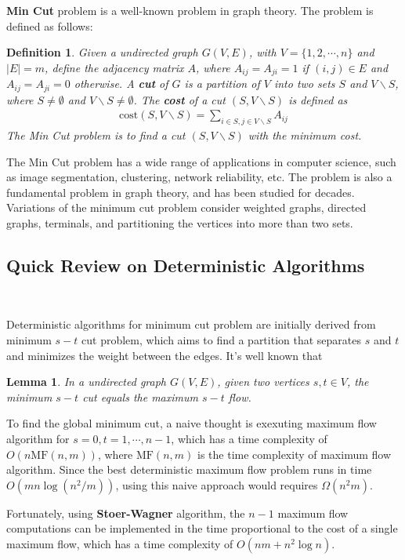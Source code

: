 \documentclass[11pt]{article}
\theoremstyle{plain}
\newtheorem{lemma}{Lemma}[section]
\newtheorem{definition}{Definition}[section]
\begin{document}
\textbf{Min Cut} problem is a well-known problem in graph theory. The problem is defined as follows: 
\begin{definition}
    Given a  undirected graph $G(V,E)$, with $V=\{1,2,\cdots,n\}$ and $|E|=m$, define the adjacency matrix $A$, where $A_{ij}=A_{ji}=1$ if $(i,j)\in E$ and $A_{ij}=A_{ji}=0$ otherwise. A \textbf{cut} of $G$ is a partition of $V$ into two sets $S$ and $V\backslash S$, where $S\neq\emptyset$ and $V\backslash S\neq\emptyset$. The \textbf{cost} of a cut $(S,V\backslash S)$ is defined as
    \begin{align*}
        \text{cost}(S,V\backslash S)=\sum_{i\in S, j\in V\backslash S}A_{ij}
    \end{align*}
    The Min Cut problem is to find a cut $(S,V\backslash S)$ with the minimum cost.
\end{definition}

The Min Cut problem has a wide range of applications in computer science, such as image segmentation, clustering, network reliability, etc. The problem is also a fundamental problem in graph theory, and has been studied for decades. Variations of the minimum cut problem consider weighted graphs, directed graphs, terminals, and partitioning the vertices into more than two sets.

\subsection{Quick Review on Deterministic Algorithms}\

Deterministic algorithms for minimum cut problem are initially derived from minimum $s-t$ cut problem, which aims to find a partition that separates $s$ and $t$ and minimizes the weight between the edges. It's well known that 
\begin{lemma}
    In a undirected graph $G(V,E)$, given two vertices $s,t\in V$, the minimum $s-t$ cut equals the maximum $s-t$ flow.
\end{lemma}
To find the global minimum cut, a naive thought is exexuting maximum flow algorithm for $s=0,t=1,\cdots,n-1$, which has a time complexity of $O(n\text{MF}(n,m))$, where $\text{MF}(n,m)$ is the time complexity of maximum flow algorithm. Since the best deterministic maximum flow problem runs in time $O(mn\log(n^2/m))$, using this naive approach would requires $\Omega(n^2m)$. 

Fortunately, using \textbf{Stoer-Wagner}\cite{stoer1997simple} algorithm, the $n-1$ maximum flow computations can be implemented in the time proportional to the cost of a single maximum flow, which has a time complexity of $O(nm+n^2\log n)$. 
\end{document}
